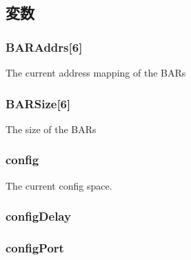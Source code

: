 \subsection{変数}
\hypertarget{classPciDevice_af7b973e5ccbf88bd0019efd69c87e06c}{
\subsubsection[{BARAddrs}]{ {\bf BARAddrs}\mbox{[}6\mbox{]}}}
\label{classPciDevice_af7b973e5ccbf88bd0019efd69c87e06c}
The current address mapping of the BARs \hypertarget{classPciDevice_ad96459f9cb0f58d55bfff45109038d7b}{
\subsubsection[{BARSize}]{ {\bf BARSize}\mbox{[}6\mbox{]}}}
\label{classPciDevice_ad96459f9cb0f58d55bfff45109038d7b}
The size of the BARs \hypertarget{classPciDevice_ade310e2edd87f54d175985e8f2a07169}{
\subsubsection[{config}]{ {\bf config}}}
\label{classPciDevice_ade310e2edd87f54d175985e8f2a07169}
The current config space. \hypertarget{classPciDevice_a0448e6a6b68c3fa53f768cd05758f1f2}{
\subsubsection[{configDelay}]{ {\bf configDelay}}}
\label{classPciDevice_a0448e6a6b68c3fa53f768cd05758f1f2}
\hypertarget{classPciDevice_a3c911166270cab77d55e5bc6626e8a05}{
\subsubsection[{configPort}]{ {\bf configPort}}}
